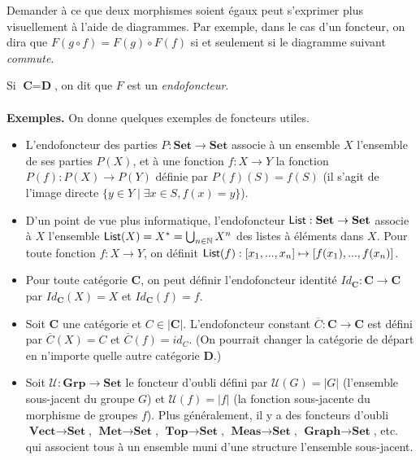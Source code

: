 \documentclass[11pt,a4paper]{report}
\newcommand{\gr}{\textbf}
\newcommand{\il}{\textit}
\newcommand{\N}{\mathbb{N}}
\newcommand{\U}{\mathcal{U}}
\newcommand{\info}[1]{\text{{\fontfamily{lmss}\selectfont #1}}}
\newcommand{\1}{\mathbbm{1}}
\begin{document}
Demander à ce que deux morphismes soient égaux peut s'exprimer plus visuellement à l'aide de diagrammes. Par exemple, dans le cas d'un foncteur, on dira que $F(g \circ f) = F(g) \circ F(f)$ si et seulement si le diagramme suivant \il{commute}.
\begin{center}
\end{center}
Si $\gr{C} = \gr{D}$, on dit que $F$ est un \il{endofoncteur}.\\\\
\gr{Exemples.} On donne quelques exemples de foncteurs utiles.\begin{itemize}
\setlength\itemsep{-0.3em}
\item L'endofoncteur des parties $P : \gr{Set} \to \gr{Set}$ associe à un ensemble $X$ l'ensemble de ses parties $P(X)$, et à une fonction $f : X \to Y$ la fonction $P(f) : P(X) \to P(Y)$ définie par $P(f)(S) = f(S)$ (il s'agit de l'image directe $\{ y \in Y \mid \exists x \in S, f(x) = y \}$).
\item D'un point de vue plus informatique, l'endofoncteur $\info{List} : \gr{Set} \to \gr{Set}$ associe à $X$ l'ensemble $\info{List}(X) = X^* = \bigcup_{n\in \N} X^n$ des listes à éléments dans $X$. Pour toute fonction $f : X \to Y$, on définit $\info{List}(f) : [x_1,...,x_n] \mapsto [f(x_1),...,f(x_n)]$.
\item Pour toute catégorie $\gr{C}$, on peut définir l'endofoncteur identité $Id_\gr{C} : \gr{C} \to \gr{C}$ par $Id_\gr{C}(X) = X$ et $Id_\gr{C}(f) = f$.
\item Soit $\gr{C}$ une catégorie et $C \in |\gr{C}|$. L'endofoncteur constant $\overline{C} : \gr{C} \to \gr{C}$ est défini par $\overline{C}(X) = C$ et $\overline{C}(f) = id_C$. (On pourrait changer la catégorie de départ en n'importe quelle autre catégorie $\gr{D}$.)
\item Soit $\U : \gr{Grp} \to \gr{Set}$ le foncteur d'oubli défini par $\U(G) = |G|$ (l'ensemble sous-jacent du groupe $G$) et $\U(f) = |f|$ (la fonction sous-jacente du morphisme de groupes $f$). Plus généralement, il y a des foncteurs d'oubli $\gr{Vect} \to \gr{Set}$, $\gr{Met} \to \gr{Set}$, $\gr{Top} \to \gr{Set}$, $\gr{Meas} \to \gr{Set}$, $\gr{Graph} \to \gr{Set}$, etc. qui associent tous à un ensemble muni d'une structure l'ensemble sous-jacent.
\end{itemize}
\end{document}

